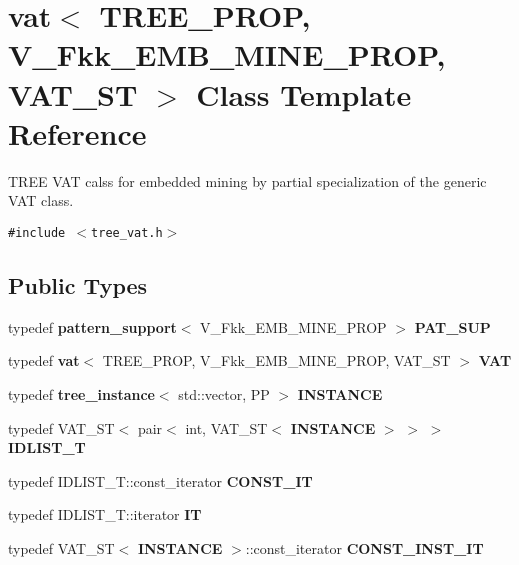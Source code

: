 \section{vat$<$ TREE\_\-PROP, V\_\-Fkk\_\-EMB\_\-MINE\_\-PROP, VAT\_\-ST $>$ Class Template Reference}
\label{classvat_3_01TREE__PROP_00_01V__Fkk__EMB__MINE__PROP_00_01VAT__ST_01_4}
TREE VAT calss for embedded mining by partial specialization of the generic VAT class.  


{\tt \#include $<$tree\_\-vat.h$>$}

\subsection*{Public Types}
\begin{CompactItemize}
\item 
typedef {\bf pattern\_\-support}$<$ V\_\-Fkk\_\-EMB\_\-MINE\_\-PROP $>$ {\bf PAT\_\-SUP}\label{classvat_3_01TREE__PROP_00_01V__Fkk__EMB__MINE__PROP_00_01VAT__ST_01_4_w0}

\item 
typedef {\bf vat}$<$ TREE\_\-PROP, V\_\-Fkk\_\-EMB\_\-MINE\_\-PROP, VAT\_\-ST $>$ {\bf VAT}\label{classvat_3_01TREE__PROP_00_01V__Fkk__EMB__MINE__PROP_00_01VAT__ST_01_4_w1}

\item 
typedef {\bf tree\_\-instance}$<$ std::vector, PP $>$ {\bf INSTANCE}\label{classvat_3_01TREE__PROP_00_01V__Fkk__EMB__MINE__PROP_00_01VAT__ST_01_4_w2}

\item 
typedef VAT\_\-ST$<$ pair$<$ int, VAT\_\-ST$<$ {\bf INSTANCE} $>$ $>$ $>$ {\bf IDLIST\_\-T}\label{classvat_3_01TREE__PROP_00_01V__Fkk__EMB__MINE__PROP_00_01VAT__ST_01_4_w3}

\item 
typedef IDLIST\_\-T::const\_\-iterator {\bf CONST\_\-IT}\label{classvat_3_01TREE__PROP_00_01V__Fkk__EMB__MINE__PROP_00_01VAT__ST_01_4_w4}

\item 
typedef IDLIST\_\-T::iterator {\bf IT}\label{classvat_3_01TREE__PROP_00_01V__Fkk__EMB__MINE__PROP_00_01VAT__ST_01_4_w5}

\item 
typedef VAT\_\-ST$<$ {\bf INSTANCE} $>$::const\_\-iterator {\bf CONST\_\-INST\_\-IT}\label{classvat_3_01TREE__PROP_00_01V__Fkk__EMB__MINE__PROP_00_01VAT__ST_01_4_w6}


\end{CompactItemize}
